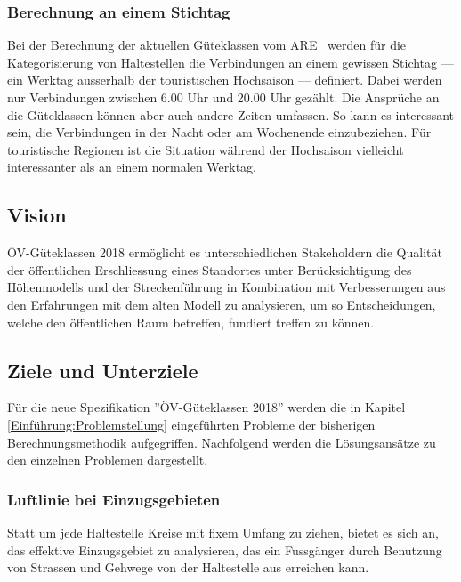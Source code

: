 \subsubsection{Berechnung an einem Stichtag}
\label{problem:Berechnung an einem Stichtag}

Bei der Berechnung der aktuellen Güteklassen vom \ac{ARE}~\cite{berechnung_are} werden für die Kategorisierung von Haltestellen die Verbindungen an einem gewissen Stichtag --- ein Werktag ausserhalb der touristischen Hochsaison --- definiert.
Dabei werden nur Verbindungen zwischen 6.00 Uhr und 20.00 Uhr gezählt.
Die Ansprüche an die Güteklassen können aber auch andere Zeiten umfassen.
So kann es interessant sein, die Verbindungen in der Nacht oder am Wochenende einzubeziehen.
Für touristische Regionen ist die Situation während der Hochsaison vielleicht interessanter als an einem normalen Werktag.

\subsection{Vision}
\label{Einführung:Vision}

\acs{ÖV}-Güteklassen 2018 ermöglicht es unterschiedlichen Stakeholdern die Qualität der öffentlichen Erschliessung eines Standortes unter Berücksichtigung des Höhenmodells und der Streckenführung in Kombination mit Verbesserungen aus den Erfahrungen mit dem alten Modell zu analysieren, um so Entscheidungen, welche den öffentlichen Raum betreffen, fundiert treffen zu können.

\subsection{Ziele und Unterziele}
\label{Einführung:Ziele und Unterziele}

Für die neue Spezifikation ''ÖV-Güteklassen 2018'' werden die in Kapitel \ref{Einführung:Problemstellung} eingeführten Probleme der bisherigen Berechnungsmethodik aufgegriffen.
Nachfolgend werden die Lösungsansätze zu den einzelnen Problemen dargestellt.


\subsubsection{Luftlinie bei Einzugsgebieten}
\label{solution:Luftlinie bei Einzugsgebieten}

Statt um jede Haltestelle Kreise mit fixem Umfang zu ziehen, bietet es sich an, das effektive Einzugsgebiet zu analysieren, das ein Fussgänger durch Benutzung von Strassen und Gehwege von der Haltestelle aus erreichen kann.

